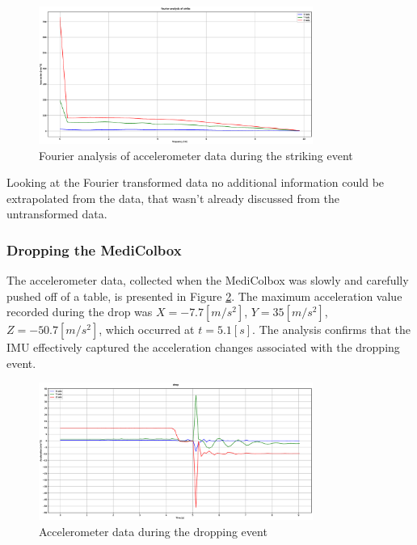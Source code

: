 \documentclass[../main.tex]{subfiles}
\begin{document}
\begin{figure}[htbp]
    \centering
    \includegraphics[width=0.8\textwidth]{resources/figures/Fourier_acceleration_strike.eps}
    \caption{Fourier analysis of accelerometer data during the striking event}
    \label{fig:fourier_accelerometer_striking}
\end{figure}

Looking at the Fourier transformed data no additional information could be extrapolated from the data, that wasn't already discussed from the untransformed data.

\clearpage
\subsubsection{Dropping the MediColbox}

The accelerometer data, collected when the MediColbox was slowly and carefully
pushed off of a table, is presented in
Figure \ref{fig:accelerometer_dropping}.
The maximum acceleration value recorded during the
drop was
$X = -7.7 [m/s^2]$, $Y = 35 [m/s^2]$, $Z = -50.7 [m/s^2]$,
which occurred at $t = 5.1[s]$.
The analysis confirms that the IMU effectively captured the
acceleration changes associated with the dropping event.

\begin{figure}[htbp]
    \centering
    \includegraphics[width=0.8\textwidth]{resources/figures/Acceleration_drop.eps}
    \caption{Accelerometer data during the dropping event}
    \label{fig:accelerometer_dropping}
\end{figure}
\end{document}
